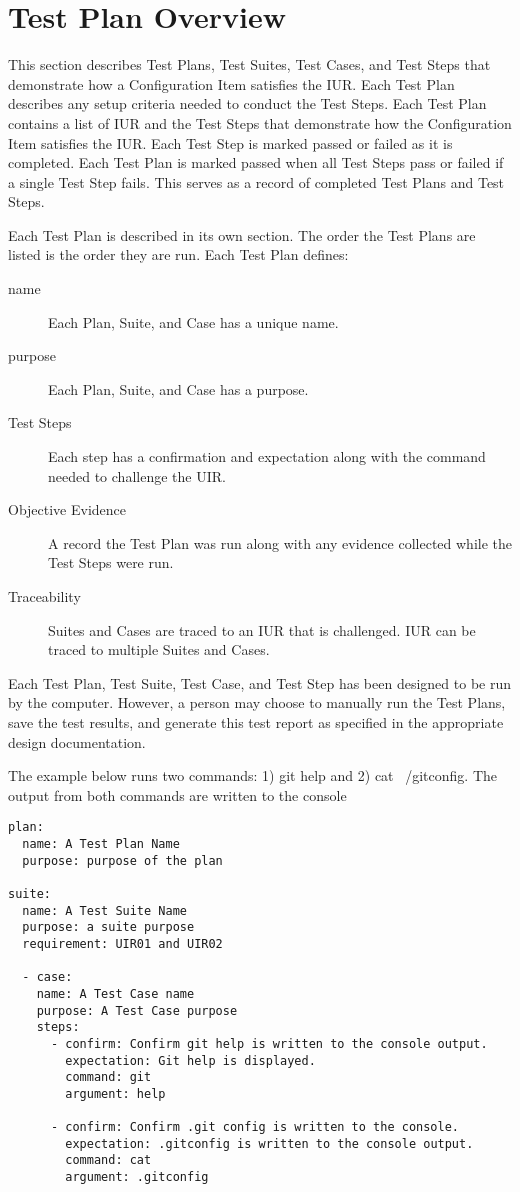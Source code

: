 \newpage
\section{Test Plan Overview}
This section describes Test Plans, Test Suites, Test Cases, and Test Steps that
demonstrate how a Configuration Item satisfies the IUR.  Each Test Plan
describes any setup criteria needed to conduct the Test Steps. Each Test Plan
contains a list of IUR and the Test Steps that demonstrate how the Configuration
Item satisfies the IUR. Each Test Step is marked passed or failed as it is
completed.  Each Test Plan is marked passed when all Test Steps pass or failed
if a single Test Step fails.  This serves as a record of completed Test Plans
and Test Steps.

Each Test Plan is described in its own section.  The order the Test Plans
are listed is the order they are run.  Each Test Plan defines:
\begin{description}

\item[name] \quad Each Plan, Suite, and Case has a unique name.

\item[purpose] \quad Each Plan, Suite, and Case has a purpose.

\item[Test Steps] \quad Each step has a confirmation and expectation along with
  the command needed to challenge the UIR.

\item[Objective Evidence] \quad
A record the Test Plan was run along with any evidence collected while
the Test Steps were run.

\item[Traceability] \quad
Suites and Cases are traced to an IUR that is challenged. IUR can be traced to
multiple Suites and Cases. 

\end{description}

Each Test Plan, Test Suite, Test Case,  and Test Step has been designed to be
run by the computer. However, a person may choose to manually run the Test
Plans, save the test results, and generate this test report as specified in the
appropriate design documentation.

The example below runs two commands: 1) git help and 2) cat ~/gitconfig.  The
output from both commands are written to the console

\begin{lstlisting}
plan: 
  name: A Test Plan Name 
  purpose: purpose of the plan

suite: 
  name: A Test Suite Name 
  purpose: a suite purpose
  requirement: UIR01 and UIR02

  - case:
    name: A Test Case name 
    purpose: A Test Case purpose
    steps: 
      - confirm: Confirm git help is written to the console output.
        expectation: Git help is displayed.
        command: git 
        argument: help

      - confirm: Confirm .git config is written to the console. 
        expectation: .gitconfig is written to the console output.
        command: cat 
        argument: .gitconfig
\end{lstlisting}
